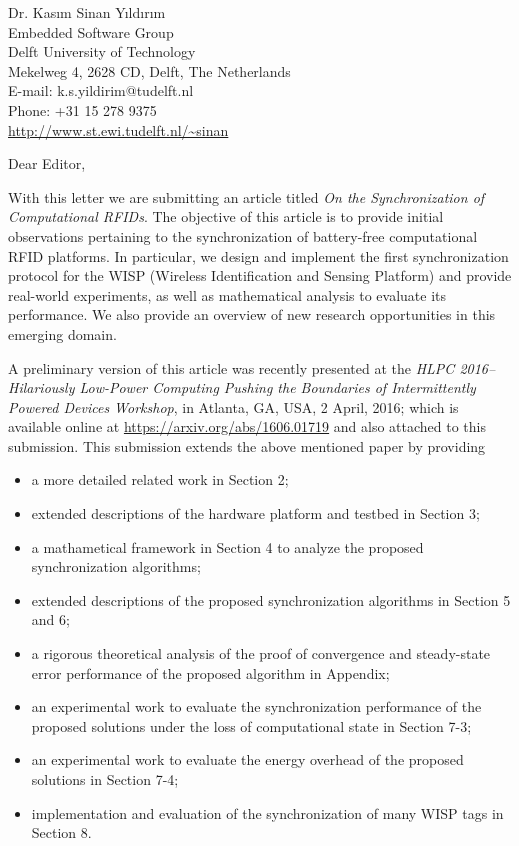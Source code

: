 \documentclass[11pt]{article}
\makeatletter
\def\Who{Dr. Kas{\i}m Sinan Y{\i}ld{\i}r{\i}m}
\def\What{}
\def\Where{Embedded Software Group}
\def\Affiliation{Delft University of Technology}
\def\Address{Mekelweg 4, 2628 CD, Delft, The Netherlands}
\def\Email{E-mail:  k.s.yildirim@tudelft.nl}
\def\Telephone{Phone: +31 15 278 9375}
\def\Webpage{\url{http://www.st.ewi.tudelft.nl/~sinan}}
\def\Sender{
	
	\begin{flushright}
		\Who \What \\
		\Where \\
		\Affiliation \\
		\Address \\
		\Email \\
		\Telephone \\
		\Webpage
	\end{flushright}	
}
\makeatother
\begin{document}
	
	\thispagestyle{empty}
	
	\Sender
	
	\bigskip
	
	
	Dear Editor,
	
	With this letter we are submitting an article titled \emph{On the Synchronization of Computational RFIDs}.
	The objective of this article is to provide initial observations pertaining to 
	the synchronization of battery-free computational RFID platforms. In 
	particular, we design and implement the first synchronization protocol for the 
	WISP (Wireless 
	Identification and Sensing Platform) and provide real-world experiments, as 
	well as mathematical analysis to evaluate its performance. We also 
	provide an overview of new 
	research opportunities in this emerging domain.
	
	
	
	A preliminary version of this article was recently presented at the \emph{HLPC 
		2016--Hilariously 
		Low-Power Computing Pushing the Boundaries of Intermittently Powered Devices 
		Workshop}, 
	in Atlanta, GA, USA, 2 April, 2016; which is available online at 
	\href{https://arxiv.org/abs/1606.01719}{https://arxiv.org/abs/1606.01719} and 
	also attached to this submission. This submission extends the above mentioned 
	paper by providing 
	\begin{itemize}
		\item a more detailed related work in Section 2;
		\item extended descriptions of the hardware platform and testbed in Section 
		3;
		\item a mathametical framework in Section 4 to analyze the proposed 
		synchronization algorithms;
		\item extended descriptions of the proposed synchronization algorithms in 
		Section 5 and 6;
		\item a rigorous theoretical analysis of the proof of convergence and 
		steady-state error performance of the proposed algorithm in Appendix;
		\item an experimental work to evaluate the synchronization
		performance of the proposed solutions under the loss of computational 
		state in Section 7-3;	
		\item an experimental work to evaluate the energy overhead of the proposed solutions in Section 7-4;	
		\item implementation and evaluation of the synchronization of 
		many WISP tags in Section 8.
	\end{itemize}
	
\end{document}
